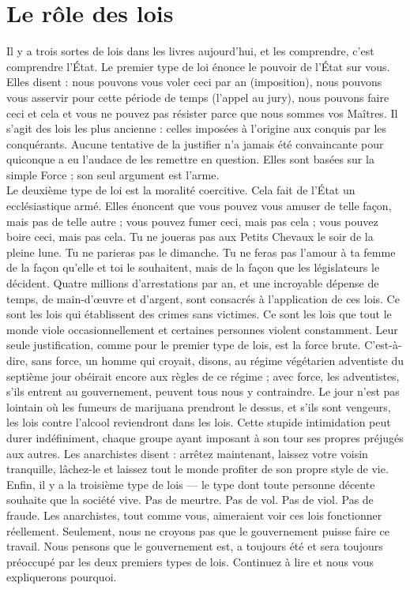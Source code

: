 \section*{Le rôle des lois}

Il y a trois sortes de lois dans les livres aujourd'hui, et les comprendre, c'est comprendre l'État. Le premier type de loi énonce le pouvoir de l'État sur vous. Elles disent : nous pouvons vous voler ceci par an (imposition), nous pouvons vous asservir pour cette période de temps (l'appel au jury), nous pouvons faire ceci et cela et vous ne pouvez pas résister parce que nous sommes vos Maîtres. Il s'agit des lois les plus ancienne : celles imposées à l'origine aux conquis par les conquérants. Aucune tentative de la justifier n'a jamais été convaincante pour quiconque a eu l'audace de les remettre en question. Elles sont basées sur la simple Force ; son seul argument est l'arme.\\
Le deuxième type de loi est la moralité coercitive. Cela fait de l'État un ecclésiastique armé. Elles énoncent que vous pouvez vous amuser de telle façon, mais pas de telle autre ; vous pouvez fumer ceci, mais pas cela ; vous pouvez boire ceci, mais pas cela. Tu ne joueras pas aux Petits Chevaux le soir de la pleine lune. Tu ne parieras pas le dimanche. Tu ne feras pas l'amour à ta femme de la façon qu'elle et toi le souhaitent, mais de la façon que les législateurs le décident. Quatre millions d'arrestations par an, et une incroyable dépense de temps, de main-d'œuvre et d'argent, sont consacrés à l'application de ces lois. Ce sont les lois qui établissent des crimes sans victimes. Ce sont les lois que tout le monde viole occasionnellement et certaines personnes violent constamment. Leur seule justification, comme pour le premier type de lois, est la force brute. C'est-à-dire, sans force, un homme qui croyait, disons, au régime végétarien adventiste du septième jour obéirait encore aux règles de ce régime ; avec force, les adventistes, s'ils entrent au gouvernement, peuvent tous nous y contraindre. Le jour n'est pas lointain où les fumeurs de marijuana prendront le dessus, et s'ils sont vengeurs, les lois contre l'alcool reviendront dans les lois. Cette stupide intimidation peut durer indéfiniment, chaque groupe ayant imposant à son tour ses propres préjugés aux autres. Les anarchistes disent : arrêtez maintenant, laissez votre voisin tranquille, lâchez-le et laissez tout le monde profiter de son propre style de vie.\\
Enfin, il y a la troisième type de lois --- le type dont toute personne décente souhaite que la société vive. Pas de meurtre. Pas de vol. Pas de viol. Pas de fraude. Les anarchistes, tout comme vous, aimeraient voir ces lois fonctionner réellement. Seulement, nous ne croyons pas que le gouvernement puisse faire ce travail. Nous pensons que le gouvernement est, a toujours été et sera toujours préoccupé par les deux premiers types de lois. Continuez à lire et nous vous expliquerons pourquoi.

